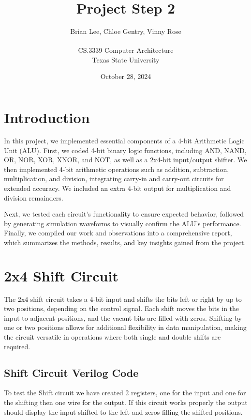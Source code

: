 \documentclass[12pt]{article}
\title{Project Step 2}
\author{Brian Lee, Chloe Gentry, Vinny Rose\\
\AND\\
\AND
\AND
\AND
\AND
	CS.3339 Computer Architecture\\
\AND
	Texas State University\\
}
\date{October 28, 2024}
\begin{document}
\maketitle

\newpage
\tableofcontents
\thispagestyle{empty}


\newpage
\setcounter{page}{1}
\section{Introduction}
In this project, we implemented essential components of a 4-bit Arithmetic Logic Unit (ALU). First, we coded 4-bit binary logic functions, including AND, NAND, OR, NOR, XOR, XNOR, and NOT, as well as a 2x4-bit input/output shifter. We then implemented 4-bit arithmetic operations such as addition, subtraction, multiplication, and division, integrating carry-in and carry-out circuits for extended accuracy. We included an extra 4-bit output for multiplication and division remainders.

Next, we tested each circuit's functionality to ensure expected behavior, followed by generating simulation waveforms to visually confirm the ALU’s performance. Finally, we compiled our work and observations into a comprehensive report, which summarizes the methods, results, and key insights gained from the project.

\section{2x4 Shift Circuit}
\label{sec:headings}

The 2x4 shift circuit takes a 4-bit input and shifts the bits left or right by up to two positions, depending on the control signal. Each shift moves the bits in the input to adjacent positions, and the vacant bits are filled with zeros. Shifting by one or two positions allows for additional flexibility in data manipulation, making the circuit versatile in operations where both single and double shifts are required.
\subsection{Shift Circuit Verilog Code}
%

To test the Shift circuit we have created 2 registers, one for the input and one for the shifting then one wire for the output. If this circuit works properly the output should display the input shifted to the left and zeros filling the shifted positions.
%
\end{document}
